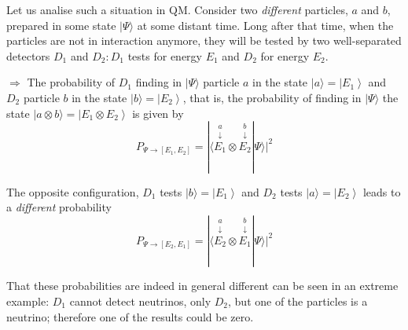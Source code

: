 \documentclass[12pt]{article}
\newcommand{\be}{\begin{equation}}
\newcommand{\ee}{\end{equation}}
\begin{document}
Let us analise such a situation in QM. Consider two
\emph{different} particles, $a$ and $b$, prepared in some
state $|\Psi\rangle$ at some distant time. Long after that time,
when the particles are not in interaction anymore,
they will be tested by two well-separated detectors $D_{1}$
and $D_{2}: D_{1}$ tests for energy $E_{1}$ and $D_{2}$ for energy $E_{2}$.

$\Rightarrow$ The probability of $D_{1}$ finding in $|\Psi\rangle$ particle $a$
in the state $|a\rangle=\left|E_{1}\right\rangle$ and $D_{2}$ particle $b$ in the
state $|b\rangle=\left|E_{2}\right\rangle$, that is, the probability of
finding in $|\Psi\rangle$ the state $|a \otimes b\rangle=\left|E_{1} \otimes E_{2}\right\rangle$
is given by
\be
P_{\Psi \rightarrow[E_{1}, E_{2}]}=|\langle 
\overset{\substack{a\\\downarrow}}{E_{1}}\otimes 
\overset{\substack{b\\\downarrow}}{E_{2}} | \Psi\rangle|^{2}
\ee

The opposite configuration, $D_1$ tests $|b\rangle=\left|E_{1}\right\rangle$ and
$D_{2}$ tests $|a\rangle=\left|E_{2}\right\rangle$ leads to a \emph{different} probability
\be
P_{\Psi \rightarrow[E_{2}, E_{1}]}=|\langle 
\overset{\substack{a\\\downarrow}}{E_{2}}\otimes 
\overset{\substack{b\\\downarrow}}{E_{1}} | \Psi\rangle|^{2}
\ee

That these probabilities are indeed in general different
can be seen in an extreme example: $D_{1}$ cannot detect
neutrinos, only $D_{2}$, but one of the particles is a neutrino;
therefore one of the results could be zero.
\end{document}
